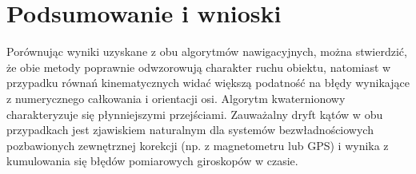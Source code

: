 \section{Podsumowanie i wnioski}
\akapit Porównując wyniki uzyskane z obu algorytmów nawigacyjnych, można stwierdzić, że obie metody poprawnie odwzorowują charakter ruchu obiektu, natomiast w przypadku równań kinematycznych widać większą podatność na błędy wynikające z numerycznego całkowania i orientacji osi. Algorytm kwaternionowy charakteryzuje się płynniejszymi przejściami. Zauważalny dryft kątów w obu przypadkach jest zjawiskiem naturalnym dla systemów bezwładnościowych pozbawionych zewnętrznej korekcji (np. z magnetometru lub GPS) i wynika z kumulowania się błędów pomiarowych giroskopów w czasie.